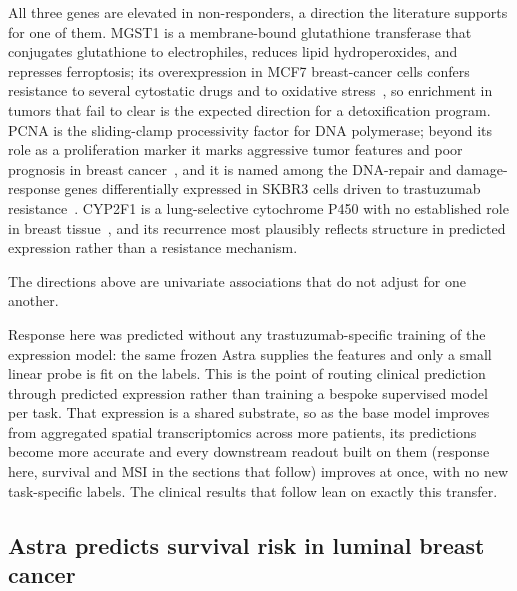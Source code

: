 \documentclass[11pt]{article}
\begin{document}
All three genes are elevated in non-responders, a direction the literature
supports for one of them. MGST1 is a membrane-bound
glutathione transferase that conjugates glutathione to electrophiles, reduces
lipid hydroperoxides, and represses ferroptosis; its overexpression in MCF7
breast-cancer cells confers resistance to several cytostatic drugs and to
oxidative stress~\cite{mgst1_ferroptosis}, so enrichment in tumors that fail to
clear is the expected direction for a detoxification program. PCNA is the
sliding-clamp processivity factor for DNA polymerase; beyond its role as a
proliferation marker it marks aggressive tumor features and poor prognosis in
breast cancer~\cite{pcna_prognosis}, and it is named among the DNA-repair and
damage-response genes differentially expressed in SKBR3 cells driven to
trastuzumab resistance~\cite{pcna_trastuzumab_resistance}.
CYP2F1 is a lung-selective
cytochrome P450 with no established role in breast tissue~\cite{cyp2f1_lung}, and
its recurrence most plausibly reflects structure in predicted expression rather
than a resistance mechanism.

The directions above are univariate associations that do not adjust for one
another.

Response here was predicted without any trastuzumab-specific training of the
expression model: the same frozen Astra supplies the features and only a small
linear probe is fit on the labels. This is the point of routing clinical
prediction through predicted expression rather than training a bespoke
supervised model per task. That expression is a shared substrate, so as the base
model improves from aggregated spatial transcriptomics across more patients, its
predictions become more accurate and every downstream readout built on them
(response here, survival and MSI in the sections that follow) improves at once,
with no new task-specific labels. The clinical results that follow lean on
exactly this transfer.

\subsection{Astra predicts survival risk in luminal breast cancer}
\label{sec:survival}
\end{document}

